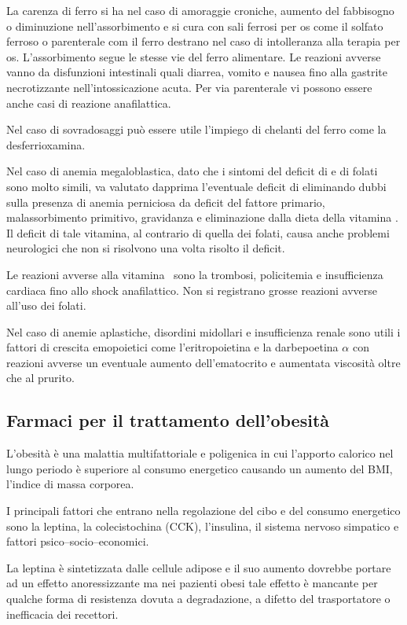 La carenza di ferro si ha nel caso di amoraggie croniche, aumento del fabbisogno o diminuzione nell'assorbimento e si cura con sali ferrosi per os come il solfato ferroso o parenterale com il ferro destrano nel caso di intolleranza alla terapia per os. L'assorbimento segue le stesse vie del ferro alimentare. Le reazioni avverse vanno da disfunzioni intestinali quali diarrea, vomito e nausea fino alla gastrite necrotizzante nell'intossicazione acuta. Per via parenterale vi possono essere anche casi di reazione anafilattica.

Nel caso di sovradosaggi può essere utile l'impiego di chelanti del ferro come la desferrioxamina.

Nel caso di anemia megaloblastica, dato che i sintomi del deficit di  e di folati sono molto simili, va valutato dapprima l'eventuale deficit di  eliminando dubbi sulla presenza di anemia perniciosa da deficit del fattore primario, malassorbimento primitivo, gravidanza e eliminazione dalla dieta della vitamina . Il deficit di tale vitamina, al contrario di quella dei folati, causa anche problemi neurologici che non si risolvono una volta risolto il deficit.

Le reazioni avverse alla vitamina~ sono la trombosi, policitemia e insufficienza cardiaca fino allo shock anafilattico. Non si registrano grosse reazioni avverse all'uso dei folati.

Nel caso di anemie aplastiche, disordini midollari e insufficienza renale sono utili i fattori di crescita emopoietici come l'eritropoietina e la darbepoetina $\alpha$ con reazioni avverse un eventuale aumento dell'ematocrito e aumentata viscosità oltre che al prurito.

\subsection{Farmaci per il trattamento dell'obesità}

L'obesità è una malattia multifattoriale e poligenica in cui l'apporto calorico nel lungo periodo è superiore al consumo energetico causando un aumento del BMI, l'indice di massa corporea.

I principali fattori che entrano nella regolazione del cibo e del consumo energetico sono la leptina, la colecistochina (CCK), l'insulina, il sistema nervoso simpatico e fattori psico--socio--economici.

La leptina è sintetizzata dalle cellule adipose e il suo aumento dovrebbe portare ad un effetto anoressizzante ma nei pazienti obesi tale effetto è mancante per qualche forma di resistenza dovuta a degradazione, a difetto del trasportatore o inefficacia dei recettori.

